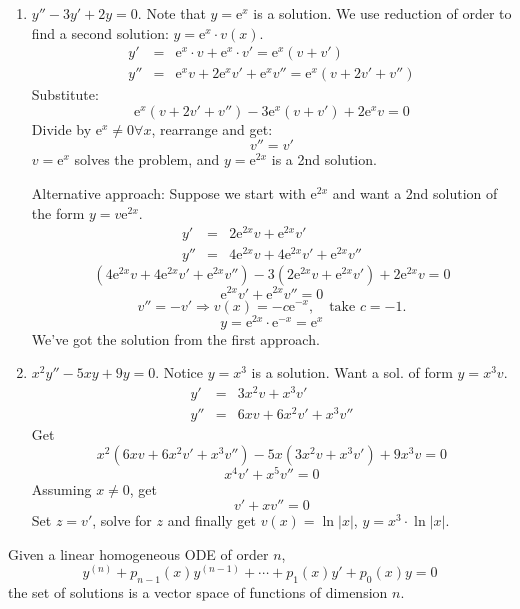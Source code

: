 \documentclass{article}
\newcommand{\mathe}{\mathrm{e}}
\begin{document}
\begin{enumerate}
  \item $y'' - 3 y' + 2 y = 0$. Note that $y = \mathe^x$ is a solution. We use
  reduction of order to find a second solution: $y = \mathe^x \cdot v (x)$.
  \begin{eqnarray*}
    y' & = & \mathe^x \cdot v + \mathe^x \cdot v' = \mathe^x (v + v')\\
    y'' & = & \mathe^x v + 2 \mathe^x v' + \mathe^x v'' = \mathe^x (v + 2 v' +
    v'')
  \end{eqnarray*}
  Substitute:
  \[ \mathe^x (v + 2 v' + v'') - 3 \mathe^x (v + v') + 2 \mathe^x v = 0 \]
  Divide by $\mathe^x \neq 0 \forall x$, rearrange and get:
  \[ v'' = v' \]
  $v = \mathe^x$ solves the problem, and $y = \mathe^{2 x}$ is a 2nd solution.
  
  Alternative approach: Suppose we start with $\mathe^{2 x}$ and want a 2nd
  solution of the form $y = v \mathe^{2 x}$.
  \begin{eqnarray*}
    y' & = & 2 \mathe^{2 x} v + \mathe^{2 x} v'\\
    y'' & = & 4 \mathe^{2 x} v + 4 \mathe^{2 x} v' + \mathe^{2 x} v''
  \end{eqnarray*}
  \[ (4 \mathe^{2 x} v + 4 \mathe^{2 x} v' + \mathe^{2 x} v'') - 3 (2
     \mathe^{2 x} v + \mathe^{2 x} v') + 2 \mathe^{2 x} v = 0 \]
  \[ \mathe^{2 x} v' + \mathe^{2 x} v'' = 0 \]
  \[ v'' = - v' \Rightarrow v (x) = - c \mathe^{- x}, \quad \text{take } c = -
     1. \]
  \[ y = \mathe^{2 x} \cdot \mathe^{- x} = \mathe^x \]
  We've got the solution from the first approach.
  
  \item $x^2 y'' - 5 xy + 9 y = 0$. Notice $y = x^3$ is a solution. Want a
  sol. of form $y = x^3 v$.
  \begin{eqnarray*}
    y' & = & 3 x^2 v + x^3 v'\\
    y'' & = & 6 xv + 6 x^2 v' + x^3 v''
  \end{eqnarray*}
  Get
  \[ x^2  (6 xv + 6 x^2 v' + x^3 v'') - 5 x (3 x^2 v + x^3 v') + 9 x^3 v = 0
  \]
  \[ x^4 v' + x^5 v'' = 0 \]
  Assuming $x \neq 0$, get
  \[ v' + xv'' = 0 \]
  Set $z = v'$, solve for $z$ and finally get $v (x) = \ln | x |$, $y = x^3
  \cdot \ln | x |$.
\end{enumerate}

Given a linear homogeneous ODE of order $n$,
\[ y^{(n)} + p_{n - 1} (x) y^{(n - 1)} + \cdots + p_1 (x) y' + p_0 (x) y = 0
\]
the set of solutions is a vector space of functions of dimension $n$.
\end{document}
